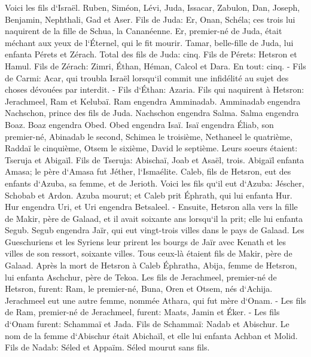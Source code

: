 \verse Voici les fils d`Israël. Ruben, Siméon, Lévi, Juda, Issacar, Zabulon, 
\verse Dan, Joseph, Benjamin, Nephthali, Gad et Aser. 
\verse Fils de Juda: Er, Onan, Schéla; ces trois lui naquirent de la fille de Schua, la Cananéenne. Er, premier-né de Juda, était méchant aux yeux de l`Éternel, qui le fit mourir. 
\verse Tamar, belle-fille de Juda, lui enfanta Pérets et Zérach. Total des fils de Juda: cinq. 
\verse Fils de Pérets: Hetsron et Hamul. 
\verse Fils de Zérach: Zimri, Éthan, Héman, Calcol et Dara. En tout: cinq. - 
\verse Fils de Carmi: Acar, qui troubla Israël lorsqu`il commit une infidélité au sujet des choses dévouées par interdit. - 
\verse Fils d`Éthan: Azaria. 
\verse Fils qui naquirent à Hetsron: Jerachmeel, Ram et Kelubaï. 
\verse Ram engendra Amminadab. Amminadab engendra Nachschon, prince des fils de Juda. 
\verse Nachschon engendra Salma. Salma engendra Boaz. 
\verse Boaz engendra Obed. Obed engendra Isaï. 
\verse Isaï engendra Éliab, son premier-né, Abinadab le second, Schimea le troisième, 
\verse Nethaneel le quatrième, Raddaï le cinquième, 
\verse Otsem le sixième, David le septième. 
\verse Leurs soeurs étaient: Tseruja et Abigaïl. Fils de Tseruja: Abischaï, Joab et Asaël, trois. 
\verse Abigaïl enfanta Amasa; le père d`Amasa fut Jéther, l`Ismaélite. 
\verse Caleb, fils de Hetsron, eut des enfants d`Azuba, sa femme, et de Jerioth. Voici les fils qu`il eut d`Azuba: Jéscher, Schobab et Ardon. 
\verse Azuba mourut; et Caleb prit Éphrath, qui lui enfanta Hur. 
\verse Hur engendra Uri, et Uri engendra Betsaleel. - 
\verse Ensuite, Hetsron alla vers la fille de Makir, père de Galaad, et il avait soixante ans lorsqu`il la prit; elle lui enfanta Segub. 
\verse Segub engendra Jaïr, qui eut vingt-trois villes dans le pays de Galaad. 
\verse Les Gueschuriens et les Syriens leur prirent les bourgs de Jaïr avec Kenath et les villes de son ressort, soixante villes. Tous ceux-là étaient fils de Makir, père de Galaad. 
\verse Après la mort de Hetsron à Caleb Éphratha, Abija, femme de Hetsron, lui enfanta Aschchur, père de Tekoa. 
\verse Les fils de Jerachmeel, premier-né de Hetsron, furent: Ram, le premier-né, Buna, Oren et Otsem, nés d`Achija. 
\verse Jerachmeel eut une autre femme, nommée Athara, qui fut mère d`Onam. - 
\verse Les fils de Ram, premier-né de Jerachmeel, furent: Maats, Jamin et Éker. - 
\verse Les fils d`Onam furent: Schammaï et Jada. Fils de Schammaï: Nadab et Abischur. 
\verse Le nom de la femme d`Abischur était Abichaïl, et elle lui enfanta Achban et Molid. 
\verse Fils de Nadab: Séled et Appaïm. Séled mourut sans fils. 

